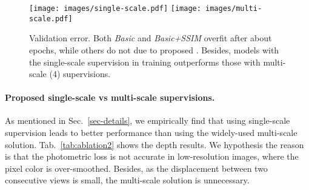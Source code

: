 \documentclass{article}
\newcommand{\tabref}[1]{Tab.~\ref{#1}}
\newcommand{\secref}[1]{Sec.~\ref{#1}}
\begin{document}
\begin{table}[h]
    \caption{Ablation studies on  and . Brackets show results of multi-scale (4) supervisions.} 
    \label{tab:ablation1}
    \centering
\end{table}


\begin{figure}[ht]
\centering
\texttt{[image: images/single-scale.pdf]} 
\texttt{[image: images/multi-scale.pdf]}
\caption{Validation error.
Both \emph{Basic} and \emph{Basic+SSIM} overfit after about  epochs, while others do not due to proposed .
Besides, models with the single-scale supervision in training outperforms those with multi-scale (4) supervisions.
}
\label{fig-ablation}
\end{figure}



\paragraph{Proposed single-scale vs multi-scale supervisions.}
As mentioned in \secref{sec-details}, we empirically find that using single-scale supervision leads to better performance than using the widely-used multi-scale solution.
\tabref{tab:ablation2} shows the depth results.
We hypothesis the reason is that the photometric loss is not accurate in low-resolution images, where the pixel color is over-smoothed.
Besides, as the displacement between two consecutive views is small, the multi-scale solution is unnecessary.
\end{document}
